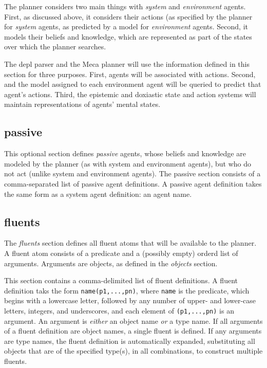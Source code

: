 \documentclass{article}
\begin{document}
The planner considers two main things with \emph{system} and \emph{environment}
agents. First, as discussed above, it considers their actions (as specified by
the planner for \emph{system} agents, as predicted by a model for
\emph{environment} agents. Second, it models their beliefs and knowledge, which
are represented as part of the states over which the planner searches.

The depl parser and the Meca planner will use the information defined in this
section for three
purposes. First, agents will be associated with actions. Second, and the model
assigned to each environment agent will be queried to predict that agent's
actions. Third, the epistemic and doxiastic state and action
systems will maintain representations of agents' mental states.



\subsection{passive}

This optional section defines \emph{passive} agents, whose beliefs and knowledge are
modeled by the planner (as with system and environment agents), but
who do not act (unlike system and environment agents).
The passive section consists of a comma-separated list of passive agent
definitions. A passive agent definition takes the same form as a system
agent definition: an agent name.



\subsection{fluents}

The \emph{fluents} section defines all fluent atoms that will be available to the planner. A
fluent atom consists of a predicate and a (possibly empty) orderd list of
arguments. Arguments are objects, as defined in the \emph{objects} section.

This section contains a comma-delimited list of fluent definitions. A fluent
definition taks the form \verb|name(p1,...,pn)|, where \verb|name| is the
predicate, which begins with a lowercase letter, followed by any number of
upper- and lower-case letters, integers, and underscores, and each element of
\verb|(p1,...,pn)| is an argument. An argument is
\emph{either} an object name \emph{or} a type name. If all arguments
of a fluent definition are object names, a single fluent is defined. If any
arguments are type names, the fluent definition is automatically expanded,
substituting all objects that are of the specified type(s), in all combinations, to
construct multiple fluents.
\end{document}

